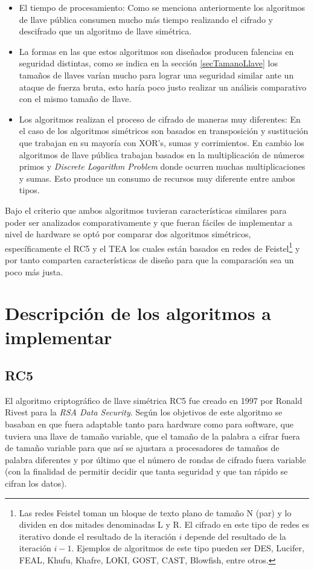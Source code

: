 \begin{itemize}
\item El tiempo de procesamiento: Como se menciona anteriormente los algoritmos de llave pública consumen mucho más tiempo realizando el cifrado y descifrado que un algoritmo de llave simétrica.

\item La formas en las que estos algoritmos son diseñados producen falencias en seguridad distintas, como se indica en la sección \ref{secTamanoLlave} los tamaños de llaves varían mucho para lograr una seguridad similar ante un ataque de fuerza bruta, esto haría poco justo realizar un análisis comparativo con el mismo tamaño de llave.

\item Los algoritmos realizan el proceso de cifrado de maneras muy diferentes: En el caso de los algoritmos simétricos son basados en transposición y sustitución que trabajan en su mayoría con XOR's, sumas y corrimientos. En cambio los algoritmos de llave pública trabajan  basados en la multiplicación de números primos y \textit{Discrete Logarithm Problem} donde ocurren muchas multiplicaciones y sumas. Esto produce un consumo de recursos muy diferente entre ambos tipos.
\end{itemize}

Bajo el criterio que ambos algoritmos tuvieran características similares para poder ser analizados comparativamente y que fueran fáciles de implementar a nivel de hardware se optó por comparar dos algoritmos simétricos, específicamente el RC5 y el TEA los cuales están basados en redes de Feistel\footnote{
Las redes Feistel toman un bloque de texto plano de tamaño N (par) y lo dividen en dos mitades denominadas L y R. El cifrado en este tipo de redes es iterativo donde el resultado de la iteración $i$ depende del resultado de la iteración $i - 1 $. Ejemplos de algoritmos de este tipo pueden ser DES, Lucifer, FEAL, Khufu, Khafre, LOKI, GOST, CAST, Blowfish, entre otros.} y por tanto comparten características de diseño para que la comparación sea un poco más justa.





\section{Descripción de los algoritmos a implementar}
\subsection{RC5}
El algoritmo criptográfico de llave simétrica RC5 fue creado en 1997 por Ronald Rivest para la \textit{RSA Data Security}. Según \cite{rivest} los objetivos de este algoritmo se basaban en que fuera adaptable tanto para hardware como para software, que tuviera una llave de tamaño variable, que el tamaño de la palabra a cifrar fuera de tamaño variable para que así se ajustara a procesadores de tamaños de palabra diferentes y por último que el número de rondas de cifrado fuera variable (con la finalidad de permitir decidir que tanta seguridad y que tan rápido se cifran los datos).

